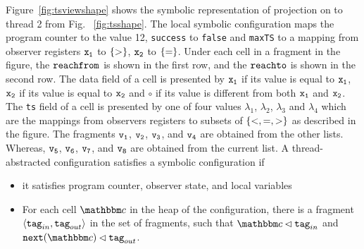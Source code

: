 
Figure~\ref{fig:tsviewshape} shows the symbolic representation of projection on to thread 2 from Fig. ~\ref{fig:tsshape}. The local symbolic configuration maps the program counter to the value 12, {\tt success} to {\tt false} and {\tt maxTS} to a mapping from observer registers $\tt x_1$ to $\left\{>\right\}$, $\tt x_2$ to $\left\{=\right\}$. Under each cell in a fragment in the figure, the $\mathtt{reachfrom}$ is shown in the first row, and the $\mathtt{reachto}$ is shown in the second row. The data field of a cell is presented by $\tt x_1$ if its value is equal to $\tt x_1$, $\tt x_2$ if its value is equal to $\tt x_2$ and $\circ$ if its value is different from both $\tt x_1$ and $\tt x_2$. The {\tt ts} field of a cell is presented by one of four values $\lambda_1$, $\lambda_2$, $\lambda_3$ and $\lambda_4$ which are the mappings from observers registers to subsets of $\left\{<,=,>\right\}$ as described in the figure. The fragments $\tt v_1$, $\tt v_2$, $\tt v_3$, and $\tt v_4$ are obtained from the other lists. Whereas, $\tt v_5$, $\tt v_6$, $\tt v_7$, and $\tt v_8$ are obtained from the current list.   
A thread-abstracted configuration satisfies a symbolic configuration if
\begin{itemize}
\item it satisfies program counter, observer state, and local variables %
\item
  For each cell $\cell$ in the heap of the configuration, there is
  a fragment $\left\langle\mathtt{tag}_{in},\mathtt{tag}_{out}\right\rangle$ in the set of fragments, such
  that $\cell \lhd \inputtag$ and ${\tt next}(\cell) \lhd \outputtag$.
\end{itemize}



